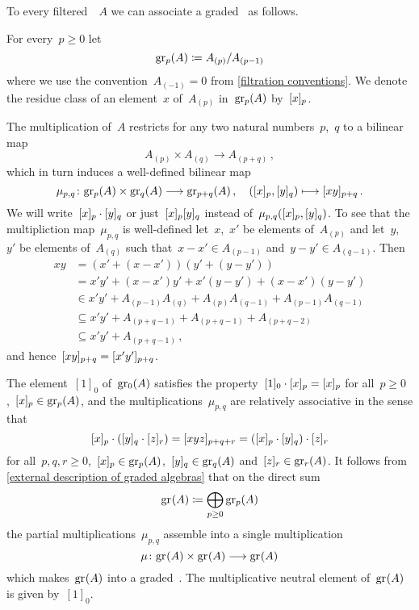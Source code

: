 \begin{construction}
  \label{construction of associated graded}
  To every filtered~{\algebra{$\kf$}}~$A$ we can associate a graded~{\algebra{$\kf$}} as follows.

  For every~$p \geq 0$ let
  \[
    \gr[p](A)
    \defined
    A_{(p)} / A_{(p-1)}
  \]
  where we use the convention~$A_{(-1)} = 0$ from \cref{filtration conventions}.
  We denote the residue class of an element~$x$ of~$A_{(p)}$ in~$\gr[p](A)$ by~$\lbrack x\rbrack_p$.
  
  The multiplication of~$A$ restricts for any two natural numbers~$p$,~$q$ to a bilinear map
  \[
    A_{(p)} \times A_{(q)} \to A_{(p+q)} \,,
  \]
  which in turn induces a well-defined bilinear map
  \[
    \mu_{p,q}
    \colon
    \gr[p](A) \times \gr[q](A)
    \to
    \gr[p+q](A) \,,
    \quad
    (\fclass{x}_p, \fclass{y}_q)
    \mapsto
    \fclass{xy}_{p+q}  \,.
  \]
  We will write~$\lbrack x\rbrack_p \cdot \lbrack y\rbrack_q$ or just~$\lbrack x\rbrack_p \lbrack y\rbrack_q$ instead of~$\mu_{p,q}(\lbrack x\rbrack_p, \lbrack y\rbrack_q)$.
  To see that the multipliction map~$\mu_{p,q}$ is well-defined let~$x$,~$x'$ be elements of~$A_{(p)}$ and let~$y$,~$y'$ be elements of~$A_{(q)}$ such that~$x - x ' \in A_{(p-1)}$ and~$y - y' \in A_{(q-1)}$.
  Then
  \begin{align*}
    x y
    &=
    (x' + (x - x')) (y' + (y - y'))
    \\
    &=
    x' y' + (x - x') y' + x' (y - y') + (x - x')(y - y')
    \\
    &\in
    x' y' + A_{(p-1)} A_{(q)} + A_{(p)} A_{(q-1)} + A_{(p-1)} A_{(q-1)}
    \\
    &\subseteq
    x' y' + A_{(p+q-1)} + A_{(p+q-1)} + A_{(p+q-2)}
    \\
    &\subseteq
    x' y' + A_{(p+q-1)} \,,
  \end{align*}
  and hence~$\lbrack xy\rbrack_{p+q} = \lbrack x'y'\rbrack_{p+q}$.
  
  The element~$[1]_0$ of~$\gr[0](A)$ satisfies the property~$[1]_0 \cdot \lbrack x\rbrack_p = \lbrack x\rbrack_p$ for all~$p \geq 0$,~$\fclass{x}_p \in \gr[p](A)$, and the multiplications~$\mu_{p,q}$ are relatively associative in the sense that
  \[
    \lbrack x\rbrack_p \cdot (\lbrack y\rbrack_q \cdot [z]_r)
    =
    [xyz]_{p+q+r}
    =
    (\lbrack x\rbrack_p \cdot \lbrack y\rbrack_q) \cdot [z]_r
  \]
  for all~$p, q, r \geq 0$,~$\fclass{x}_p \in \gr[p](A)$,~$\fclass{y}_q \in \gr[q](A)$ and~$[z]_r \in \gr[r](A)$.
  It follows from \cref{external description of graded algebras} that on the direct sum
  \[
    \gr(A)
    \defined
    \bigoplus_{p \geq 0} \gr[p](A)
  \]
  the partial multiplications~$\mu_{p,q}$ assemble into a single multiplication
  \[
    \mu
    \colon
    \gr(A) \times \gr(A)
    \to
    \gr(A)
  \]
  which makes~$\gr(A)$ into a graded~{\algebra{$\kf$}}.
  The multiplicative neutral element of~$\gr(A)$ is given by~$[1]_0$.
\end{construction}


